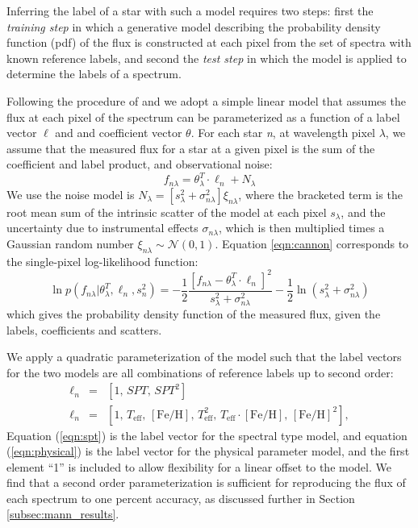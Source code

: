 \documentclass[twocolumn]{aastex62}
\newcommand{\teff}{T_{\mathrm{eff}}}
\newcommand{\feh}{[{\mathrm{Fe}/\mathrm{H}}]}
\begin{document}
Inferring the label of a star with such a model requires two steps: first the \emph{training step} in which a generative model describing the probability density function (pdf) of the flux is constructed at each pixel from the set of spectra with known reference labels, and second the \emph{test step} in which the model is applied to determine the labels of a spectrum.

Following the procedure of \citealt{Ness:2015} and \citealt{Ho:2017a} we adopt a simple linear model that assumes the flux at each pixel of the spectrum can be parameterized as a function of a label vector $\ell$ and and coefficient vector \emph{$\theta$}. For each star \emph{n}, at wavelength pixel \emph{$\lambda$}, we assume that the measured flux for a star at a given pixel is the sum of the coefficient and label product, and observational noise:
\begin{equation}
	f_{n\lambda} = \theta_{\lambda}^{T} \cdot \ell_{n} + N_{\lambda} \label{eqn:cannon}
\end{equation} 
We use the noise model is $N_{\lambda}=[s_{\lambda}^2 + \sigma_{n\lambda}^2]\xi_{n\lambda}$, where the bracketed term is the root mean sum of the intrinsic scatter of the model at each pixel \emph{$s_{\lambda}$}, and the uncertainty due to instrumental effects \emph{$\sigma_{n\lambda}$}, which is then multiplied times a Gaussian random number $\xi_{n\lambda} \sim \mathcal{N} (0,1)$. Equation \ref{eqn:cannon} corresponds to the single-pixel log-likelihood function:
\begin{equation}
	\ln p(f_{n\lambda}|\theta^T_{\lambda}, \ell_n, s^2_n) = 
	-\frac{1}{2}\frac{[f_{n\lambda} - \theta_{\lambda}^{T} \cdot \ell_{n}]^2}{s_{\lambda}^2 + \sigma_{n\lambda}^2} - \frac{1}{2} \ln(s_{\lambda}^2 + \sigma_{n\lambda}^2) 
	\label{eqn:likelihood}
\end{equation}
which gives the probability density function of the measured flux, given the labels, coefficients and scatters.

We apply a quadratic parameterization of the model such that the label vectors for the two models are all combinations of reference labels up to second order:
\begin{eqnarray}
\ell_{n} &=& [1, \, SPT, \, SPT^{2}] \label{eqn:spt}
\\
\ell_{n} &=& [1, \, \teff, \, \feh, \, \teff^2, \, \teff \cdot \feh, \, \feh^{2}] \label{eqn:physical}
,
\end{eqnarray}
Equation (\ref{eqn:spt}) is the label vector for the spectral type model, and equation (\ref{eqn:physical}) is the label vector for the physical parameter model, and the first element ``1'' is included to allow flexibility for a linear offset to the model. We find that a second order parameterization is sufficient for reproducing the flux of each spectrum to one percent accuracy, as discussed further in Section \ref{subsec:mann_results}.
\end{document}
